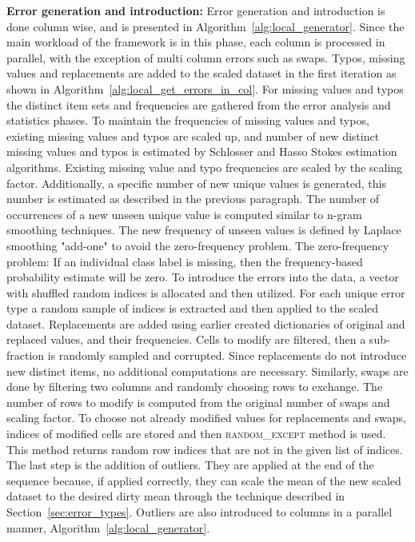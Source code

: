 \textbf{Error generation and introduction:} 
Error generation and introduction is done column wise, and is presented in Algorithm~\ref{alg:local_generator}. 
Since the main workload of the framework is in this phase, each column is processed in parallel, with the exception of multi column errors such as swaps.
Typos, missing values and replacements are added to the scaled dataset in the first iteration as shown in Algorithm~\ref{alg:local_get_errors_in_col}.
For missing values and typos the distinct item sets and frequencies are gathered from the error analysis and statistics phases. 
To maintain the frequencies of missing values and typos, existing missing values and typos are scaled up, and number of new distinct missing values and typos is estimated by Schlosser \cite{HassNSS1995} and Hasso Stokes \cite{HassS1998} estimation algorithms.
Existing missing value and typo frequencies are scaled by the scaling factor. 
Additionally, a specific number of new unique values is generated, this number is estimated as described in the previous paragraph.
The number of occurrences of a new unseen unique value is computed similar to n-gram smoothing techniques. 
The new frequency of unseen values is defined by Laplace smoothing "add-one" to avoid the zero-frequency problem.
The zero-frequency problem: If an individual class label is missing, then the frequency-based probability estimate will be zero.
To introduce the errors into the data, a vector with shuffled random indices is allocated and then utilized. 
For each unique error type a random sample of indices is extracted and then applied to the scaled dataset.
Replacements are added using earlier created dictionaries of original and replaced values, and their frequencies.
Cells to modify are filtered, then a sub-fraction is randomly sampled and corrupted.
Since replacements do not introduce new distinct items, no additional computations are necessary.
Similarly, swaps are done by filtering two columns and randomly choosing rows to exchange. 
The number of rows to modify is computed from the original number of swaps and scaling factor.
To choose not already modified values for replacements and swaps, indices of modified cells are stored and then \textsc{random\_except} method is used.
This method returns random row indices that are not in the given list of indices.
The last step is the addition of outliers. 
They are applied at the end of the sequence because, if applied correctly, they can scale the mean of the new scaled dataset to the desired dirty mean through the technique described in Section~\ref{sec:error_types}. 
Outliers are also introduced to columns in a parallel manner, Algorithm~\ref{alg:local_generator}.

